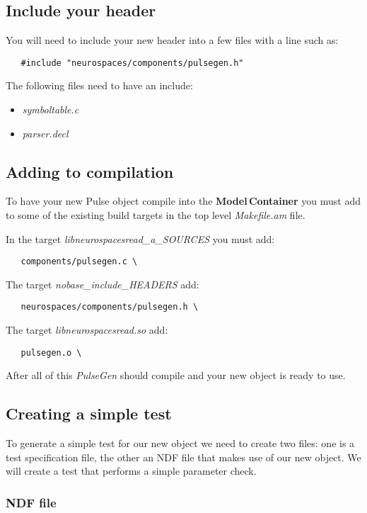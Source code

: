 \documentclass[12pt]{article}
\begin{document}
\subsection*{Include your header}

You will need to include your new header into a few files with a line such as:
\begin{verbatim}
   #include "neurospaces/components/pulsegen.h"
\end{verbatim}
The following files need to have an include:
\begin{itemize}
   \item[]{\it symboltable.c}
   \item[]{\it parser.decl}
\end{itemize}

\subsection*{Adding to compilation}

To have your new Pulse object compile into the {\bf Model\,Container} you must add to some of the existing build targets in the top level {\it Makefile.am} file.

In the target {\it libneurospacesread\_a\_SOURCES} you must add:
\begin{verbatim}
   components/pulsegen.c \
\end{verbatim}
The target {\it nobase\_include\_HEADERS} add:
\begin{verbatim}
   neurospaces/components/pulsegen.h \
\end{verbatim}
The target {\it libneurospacesread.so} add:
\begin{verbatim}
   pulsegen.o \
\end{verbatim}
After all of this {\it PulseGen} should compile and your new object is ready to use.

\subsection*{Creating a simple test}

To generate a simple test for our new object we need to create two files: one is a test specification file, the other an NDF file that makes use of our new object. We will create a test that performs a simple parameter check.

\subsubsection*{NDF file}
\end{document}
